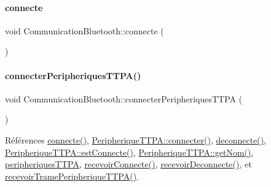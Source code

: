 \mbox{\label{class_communication_bluetooth_a76f44488775d68071d43b418a7a1c75e}} 
\paragraph{\texorpdfstring{connecte}{connecte}\hspace{0.1cm}{\footnotesize\ttfamily [2/2]}}
{\footnotesize\ttfamily void Communication\+Bluetooth\+::connecte (\begin{DoxyParamCaption}{ }\end{DoxyParamCaption})\hspace{0.3cm}{\ttfamily [signal]}}

\mbox{\label{class_communication_bluetooth_a321073d9dc26aad4b34ecf41a1dee8a4}} 
\paragraph{\texorpdfstring{connecter\+Peripheriques\+T\+T\+P\+A()}{connecterPeripheriquesTTPA()}}
{\footnotesize\ttfamily void Communication\+Bluetooth\+::connecter\+Peripheriques\+T\+T\+PA (\begin{DoxyParamCaption}{ }\end{DoxyParamCaption})}



Références \hyperlink{class_communication_bluetooth_a76f44488775d68071d43b418a7a1c75e}{connecte()}, \hyperlink{class_peripherique_t_t_p_a_a8afa92f7c3ae6e1edc30f5c8b386af81}{Peripherique\+T\+T\+P\+A\+::connecter()}, \hyperlink{class_communication_bluetooth_abab4c8889f42c8b818895af96863480e}{deconnecte()}, \hyperlink{class_peripherique_t_t_p_a_a33991b646ef2a49e79bac478b5f722c7}{Peripherique\+T\+T\+P\+A\+::est\+Connecte()}, \hyperlink{class_peripherique_t_t_p_a_abb04680791a7e778ac3808b5d218421f}{Peripherique\+T\+T\+P\+A\+::get\+Nom()}, \hyperlink{class_communication_bluetooth_a656a80f8216d2a4db7cf2f865365e562}{peripheriques\+T\+T\+PA}, \hyperlink{class_communication_bluetooth_aee7edc20fc1fdfd5a5a1c228c1319531}{recevoir\+Connecte()}, \hyperlink{class_communication_bluetooth_af187cbc294befb656070f9817763104b}{recevoir\+Deconnecte()}, et \hyperlink{class_communication_bluetooth_ae50bbbf70a5afdea0a0c4d3322e90e40}{recevoir\+Trame\+Peripherique\+T\+T\+P\+A()}.


